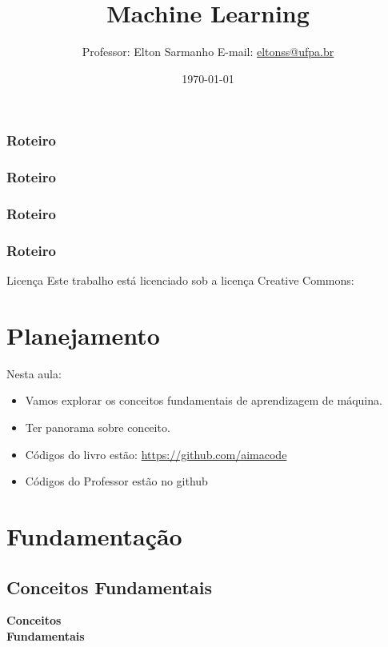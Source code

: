 \documentclass{beamer}
\title[]{Machine Learning}
\author[Elton Sarmanho]{ 
Professor: Elton Sarmanho\inst{1} 
\newline
E-mail: \href{mailto:eltonss@ufpa.br}{eltonss@ufpa.br}\newline
\href{https://github.com/eltonsarmanho}{\faGithub} \href{https://www.linkedin.com/in/elton-sarmanho-836553185/}{\faLinkedinSquare}\\
\ccbyncsa
}
\institute[UFPA]{
   \inst{1}%
     Faculdade de Sistemas de Informação - UFPA/CUNTINS
     }
\date{\today}
\begin{document}
\begin{frame}
\titlepage
\end{frame}

\begin{frame}
\frametitle{Roteiro}
\tableofcontents[sections={1-3}]
\end{frame}
\begin{frame}
\frametitle{Roteiro}
\tableofcontents[sections={4-6}]
\end{frame}

\begin{frame}
\frametitle{Roteiro}
\tableofcontents[sections={7-8}]
\end{frame}

\begin{frame}
\frametitle{Roteiro}
\tableofcontents[sections={9-10}]
\end{frame}
\begin{frame}{Licença}
    Este trabalho está licenciado sob a licença Creative Commons:

    \bigskip
    \ccbyncsa
\end{frame}

\section{Planejamento}

\begin{frame}
Nesta aula:

\begin{itemize}
 \item Vamos explorar os conceitos fundamentais de aprendizagem de máquina.
 \item Ter panorama sobre conceito.
 \item Códigos do livro estão: \url{https://github.com/aimacode}
 \item Códigos do Professor estão no github
\end{itemize}


\end{frame}

\section{Fundamentação}
\subsection{Conceitos Fundamentais}
\begin{frame}
\centering
\Huge
\textbf{Conceitos\\ Fundamentais}
\end{frame}
\end{document}
